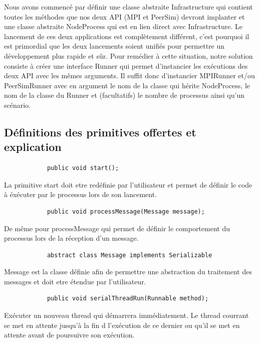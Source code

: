 \documentclass{article}
\begin{document}
			\vspace{20mm}
			Nous avons commencé par définir une classe abstraite Infrastructure qui contient toutes les méthodes que nos deux API (MPI et PeerSim) devront implanter et une classe abstraite NodeProcess qui est en lien direct avec Infrastructure.
			\newline
			Le lancement de ces deux applications est complètement différent, c’est pourquoi il est primordial que les deux lancements soient unifiés pour permettre un développement plus rapide et sûr. Pour remédier à cette situation, notre solution consiste à créer une interface Runner qui permet d’instancier les exécutions des deux API avec les mêmes arguments. Il suffit donc d’instancier MPIRunner et/ou PeerSimRunner avec en argument le nom de la classe qui hérite NodeProcess, le nom de la classe du Runner et (facultatifs) le nombre de processus ainsi qu’un scénario.			

			\newpage
			\subsection{Définitions des primitives offertes et explication}
			\begin{lstlisting}
			public void start();
			\end{lstlisting}
			La primitive start  doit etre redéfinie par l'utilisateur et permet de définir le code à éxécuter par le processus lors de son lancement.
			\vspace*{2.5mm}

			\begin{lstlisting}
			public void processMessage(Message message);
			\end{lstlisting}
			De même pour processMessage qui permet  de définir le comportement du processus lors de la réception d'un message.
			\vspace*{2.5mm}

			\begin{lstlisting}
			abstract class Message implements Serializable
			\end{lstlisting}
			Message est la classe définie afin de permettre une abstraction du traitement des messages et doit etre étendue par l'utilisateur.
			\vspace*{3mm}

			\begin{lstlisting}
			public void serialThreadRun(Runnable method);
			\end{lstlisting}
			Exécuter un nouveau thread qui démarrera immédiatement. 
			Le thread courrant se met en attente jusqu'à la fin d l'exécution de ce dernier ou qu'il se met en attente avant de poursuivre son exécution.
			\vspace*{3mm}
\end{document}
